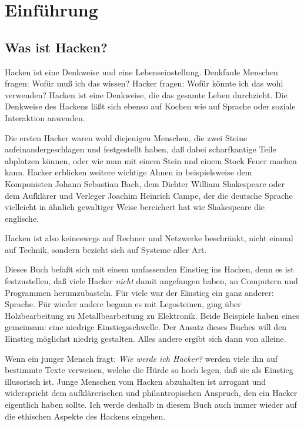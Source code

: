 
\chapter{Einführung}

\section{Was ist Hacken?}

Hacken ist eine Denkweise und eine Lebenseinstellung. Denkfaule Menschen fragen: Wofür muß ich das wissen? Hacker fragen: Wofür könnte ich das wohl verwenden? Hacken ist eine Denkweise, die das gesamte Leben durchzieht. Die Denkweise des Hackens läßt sich ebenso auf Kochen wie auf Sprache oder soziale Interaktion anwenden. 

Die ersten Hacker waren wohl diejenigen Menschen, die zwei Steine aufeinandergeschlagen und festgestellt haben, daß dabei scharfkantige Teile abplatzen können, oder wie man mit einem Stein und einem Stock Feuer machen kann. Hacker erblicken weitere wichtige Ahnen in beispielsweise dem Komponisten Johann Sebastian Bach, dem Dichter William Shakespeare oder dem Aufklärer und Verleger Joachim Heinrich Campe, der die deutsche Sprache vielleicht in ähnlich gewaltiger Weise bereichert hat wie Shakespeare die englische. 

Hacken ist also keineswegs auf Rechner und Netzwerke beschränkt, nicht einmal auf Technik, sondern bezieht sich auf Systeme aller Art. 

Dieses Buch befaßt sich mit einem umfassenden Einstieg ins Hacken, denn es ist festzustellen, daß viele Hacker \emph{nicht} damit angefangen haben, an Computern und Programmen herumzubasteln. Für viele war der Einstieg ein ganz anderer: Sprache. Für wieder andere begann es mit Legosteinen, ging über Holzbearbeitung zu Metallbearbeitung zu Elektronik. Beide Beispiele haben eines gemeinsam: eine niedrige Einstiegsschwelle. Der Ansatz dieses Buches will den Einstieg möglichst niedrig gestalten. Alles andere ergibt sich dann von alleine.

Wenn ein junger Mensch fragt: \emph{Wie werde ich Hacker?} werden viele ihn auf bestimmte Texte verweisen, welche die Hürde so hoch legen, daß sie als Einstieg illusorisch ist. Junge Menschen vom Hacken abzuhalten ist arrogant und widerspricht dem aufklärerischen und philantropischen Anspruch, den ein Hacker eigentlich haben sollte. Ich werde deshalb in diesem Buch auch immer wieder auf die ethischen Aspekte des Hackens eingehen.

